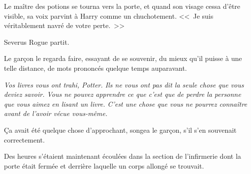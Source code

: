 Le maître des potions se tourna vers la porte, et quand son visage cessa d'être visible, sa voix parvint à Harry comme un chuchotement. <<~Je suis véritablement navré de votre perte.~>>

Severus Rogue partit.

Le garçon le regarda faire, essayant de se souvenir, du mieux qu'il puisse à une telle distance, de mots prononcés quelque temps auparavant.

\emph{Vos livres vous ont trahi, Potter. Ils ne vous ont pas dit la seule chose que vous deviez savoir. Vous ne pouvez apprendre ce que c'est que de perdre la personne que vous aimez en lisant un livre. C'est une chose que vous ne pourrez connaître avant de l'avoir vécue vous-même.}

Ça avait été quelque chose d'approchant, songea le garçon, s'il s'en souvenait correctement.

\later

Des heures s'étaient maintenant écoulées dans la section de l'infirmerie dont la porte était fermée et derrière laquelle un corps allongé se trouvait.

